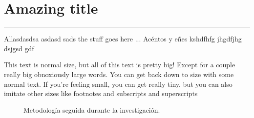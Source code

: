 
\chapter{Amazing title}\label{capit:cap1}
\vspace{-2.0325ex}%
\noindent
\rule{\textwidth}{0.5pt}
\vspace{-5.5ex}%
\newcommand{\pushline}{\Indp}%


Allasdasdsa asdasd sads the stuff goes here ... Acéntos y eñes kshdfhfg jhgdfjhg dsjgsd gdf 

This text is normal size, but
\large
all of this text is pretty big!
Except for a couple
{\Large really} big
{\LARGE obnoxiously} large
{\Huge words}.
You can get back down to size with some
{\normalsize normal text}.
If you're feeling
{\small small}, you can get really
{\tiny tiny}, but you can also imitate other sizes like
{\footnotesize footnotes} and
{\scriptsize subscripts and superscripts}

\begin{figure}[h]
        \centering
        \caption{Metodolog\'ia seguida durante la investigaci\'on.} \label{fig:pusheenestudiando}
\end{figure}





\newpage
